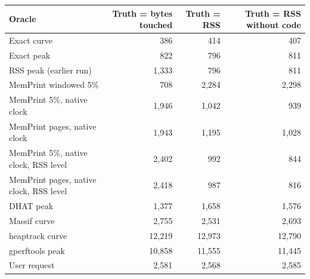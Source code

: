\begin{tabular}{lrrr}
\toprule
Oracle & Truth = bytes touched & Truth = RSS & Truth = RSS without code \\
\midrule
Exact curve & 386 & 414 & 407 \\
Exact peak & 822 & 796 & 811 \\
RSS peak (earlier run) & 1{,}333 & 796 & 811 \\
MemPrint windowed 5\% & 708 & 2{,}284 & 2{,}298 \\
MemPrint 5\%, native clock & 1{,}946 & 1{,}042 & 939 \\
MemPrint pages, native clock & 1{,}943 & 1{,}195 & 1{,}028 \\
MemPrint 5\%, native clock, RSS level & 2{,}402 & 992 & 844 \\
MemPrint pages, native clock, RSS level & 2{,}418 & 987 & 816 \\
DHAT peak & 1{,}377 & 1{,}658 & 1{,}576 \\
Massif curve & 2{,}755 & 2{,}531 & 2{,}693 \\
heaptrack curve & 12{,}219 & 12{,}973 & 12{,}790 \\
gperftools peak & 10{,}858 & 11{,}555 & 11{,}445 \\
User request & 2{,}581 & 2{,}568 & 2{,}585 \\
\bottomrule
\end{tabular}
